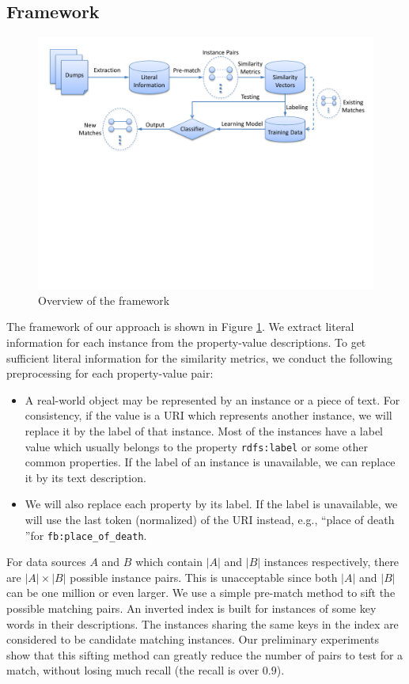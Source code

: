 \subsection{Framework}
\label{sec:framework}

\begin{figure}[t]
  \centering
  \includegraphics[width=1\textwidth]{figures/framework}
  \caption{Overview of the framework}
  \label{fig:framework}
\end{figure}
The framework of our approach is shown in Figure \ref{fig:framework}. We extract literal information for each instance from the property-value descriptions. To get sufficient literal information for the similarity metrics, we conduct the following preprocessing for each property-value pair:
\begin{itemize}
\item A real-world object may be represented by an instance or a piece of text. For consistency, if the value is a URI which represents another instance, we will replace it by the label of that instance. Most of the instances have a label value which usually belongs to the property \texttt{rdfs:label} or some other common properties\cite{ell2011labels}. If the label of an instance is unavailable, we can replace it by its text description.
\item We will also replace each property by its label. If the label is unavailable, we will use the last token (normalized) of the URI instead, e.g., \textquotedblleft place of death \textquotedblright for \texttt{fb:place\_of\_death}.
\end{itemize}
For data sources $A$ and $B$ which contain $|A|$ and $|B|$ instances respectively, there are $|A|\times|B|$ possible instance pairs. This is unacceptable since both $|A|$ and $|B|$ can be one million or even larger. We use a simple pre-match method to sift the possible matching pairs. An inverted index is built for instances of some key words in their descriptions. The instances sharing the same keys in the index are considered to be candidate matching instances. Our preliminary experiments show that this sifting method can greatly reduce the number of pairs  to test for a match, without losing much recall (the recall is over $0.9$).

